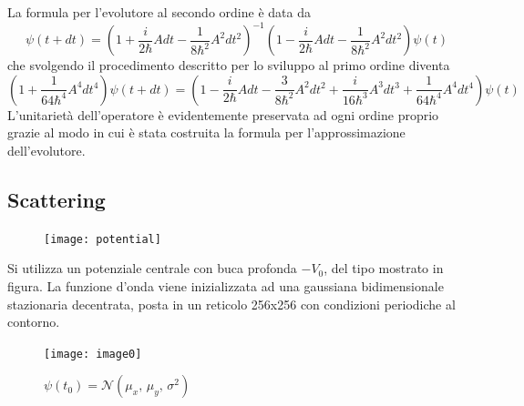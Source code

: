 La formula per l'evolutore al secondo ordine è data da
$$\psi(t+dt)=\left(1+\frac{i}{2\hbar}Adt-\frac{1}{8\hbar^2}A^2dt^2\right)^{-1}\left(1-\frac{i}{2\hbar}Adt-\frac{1}{8\hbar^2}A^2dt^2\right)\psi(t)$$
che svolgendo il procedimento descritto per lo sviluppo al primo ordine diventa
$$\left(1+\frac{1}{64\hbar^4}A^4dt^4\right)\psi(t+dt)=\left(1-\frac{i}{2\hbar}Adt-\frac{3}{8\hbar^2}A^2dt^2+\frac{i}{16\hbar^3}A^3dt^3+\frac{1}{64\hbar^4}A^4dt^4\right)\psi(t)$$
L'unitarietà dell'operatore è evidentemente preservata ad ogni ordine proprio grazie al modo in cui è stata costruita la formula per l'approssimazione dell'evolutore.


\subsection{Scattering}
\begin{figure}[H]
\centering
\texttt{[image: potential]}
\label{fig:potential}
\end{figure}
Si utilizza un potenziale centrale con buca profonda $-V_0$, del tipo mostrato in figura. La funzione d'onda viene inizializzata ad una gaussiana bidimensionale stazionaria decentrata, posta in un reticolo 256x256 con condizioni periodiche al contorno.
\begin{figure}[H]
\centering
\texttt{[image: image0]}
  \caption{$\psi(t_0)=\mathcal{N}(\mu_x,\,\mu_y,\,\sigma^2)$}
\label{fig:image0}
\end{figure}


